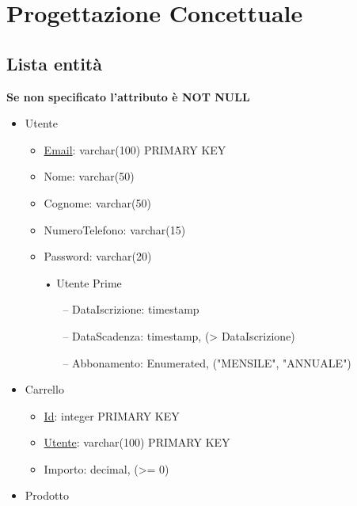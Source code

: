 \documentclass[10pt]{article}
\begin{document}
\section{Progettazione Concettuale}

\subsection{Lista entità}

\textbf{Se non specificato l'attributo è NOT NULL}
\begin{itemize}
    \itemsep0em 
    \item Utente
    \begin{itemize}
        \itemsep0em 
        \item \underline{Email}: varchar(100) PRIMARY KEY
        \item Nome: varchar(50)
        \item Cognome: varchar(50)
        \item NumeroTelefono: varchar(15)
        \item Password: varchar(20)
        \item[•] Utente Prime
        \begin{itemize}
            \itemsep0em 
            \item[–] DataIscrizione: timestamp
            \item[–] DataScadenza: timestamp, (\textgreater{} DataIscrizione)
            \item[–] Abbonamento: Enumerated, ("MENSILE", "ANNUALE")
        \end{itemize}
    \end{itemize}
    \item Carrello
    \begin{itemize}
        \itemsep0em 
        \item \underline{Id}: integer PRIMARY KEY
        \item \underline{Utente}: varchar(100) PRIMARY KEY
        \item Importo: decimal, (\textgreater{}= 0)
    \end{itemize}
    \item Prodotto
    \begin{itemize}

\end{itemize}
\end{itemize}
\end{document}
